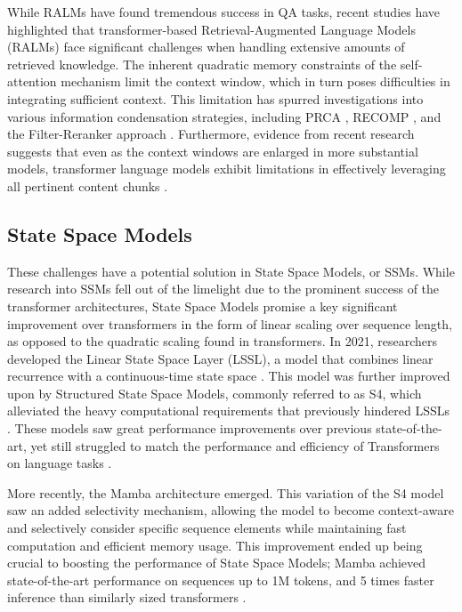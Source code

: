 \documentclass[11pt]{article}
\begin{document}
While RALMs have found tremendous success in QA tasks, recent studies have highlighted that transformer-based Retrieval-Augmented Language Models (RALMs) face significant challenges when handling extensive amounts of retrieved knowledge. The inherent quadratic memory constraints of the self-attention mechanism limit the context window, which in turn poses difficulties in integrating sufficient context. This limitation has spurred investigations into various information condensation strategies, including PRCA \cite{yang-etal-2023-prca}, RECOMP \cite{xu2023recomp}, and the Filter-Reranker approach \cite{ma2023large}. Furthermore, evidence from recent research suggests that even as the context windows are enlarged in more substantial models, transformer language models exhibit limitations in effectively leveraging all pertinent content chunks \cite{xu2024retrieval} \cite{liu2023lost}. 

\subsection{State Space Models}

These challenges have a potential solution in State Space Models, or SSMs. While research into SSMs fell out of the limelight due to the prominent success of the transformer architectures, State Space Models promise a key significant improvement over transformers in the form of linear scaling over sequence length, as opposed to the quadratic scaling found in transformers. In 2021, researchers developed the Linear State Space Layer (LSSL), a model that combines linear recurrence with a continuous-time state space \cite{gu2021combining}. This model was further improved upon by Structured State Space Models, commonly referred to as S4, which alleviated the heavy computational requirements that previously hindered LSSLs \cite{gu2022}. These models saw great performance improvements over previous state-of-the-art, yet still struggled to match the performance and efficiency of Transformers on language tasks \cite{gu2023mamba}.

More recently, the Mamba architecture emerged. This variation of the S4 model saw an added selectivity mechanism, allowing the model to become context-aware and selectively consider specific sequence elements while maintaining fast computation and efficient memory usage. This improvement ended up being crucial to boosting the performance of State Space Models; Mamba achieved state-of-the-art performance on sequences up to 1M tokens, and 5 times faster inference than similarly sized transformers \cite{gu2023mamba}.
\end{document}
